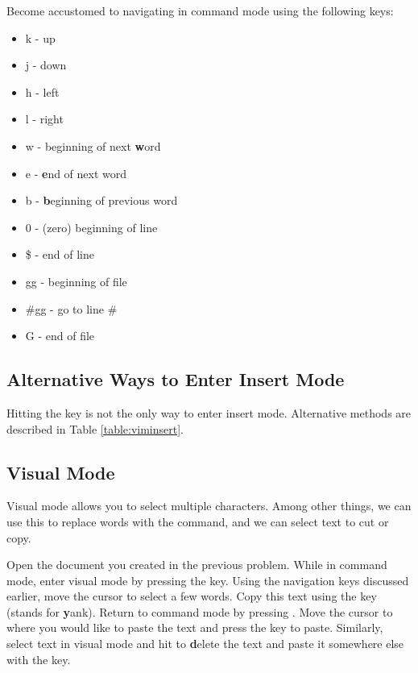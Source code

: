 \begin{problem}
Become accustomed to navigating in command mode using the following keys:
\begin{itemize}
\item k - up
\item j - down
\item h - left
\item l - right
\item w - beginning of next \textbf{w}ord
\item e - \textbf{e}nd of next word
\item b - \textbf{b}eginning of previous word
\item 0 - (zero) beginning of line
\item \$ - end of line
\item gg - beginning of file
\item \#gg - go to line \#
\item G - end of file
\end{itemize}
\end{problem}

\subsection*{Alternative Ways to Enter Insert Mode} %

Hitting the  key is not the only way to enter insert mode.
Alternative methods are described in Table \ref{table:viminsert}.

\subsection*{Visual Mode} %

Visual mode allows you to select multiple characters.
Among other things, we can use this to replace words with the  command, and we can select text to cut or copy.

\begin{problem}
Open the document you created in the previous problem.
While in command mode, enter visual mode by pressing the  key.
Using the navigation keys discussed earlier, move the cursor to select a few words.
Copy this text using the  key (stands for \textbf{y}ank).
Return to command mode by pressing .
Move the cursor to where you would like to paste the text and press the  key to paste.
Similarly, select text in visual mode and hit  to \textbf{d}elete the text and paste it somewhere else with the  key.
\end{problem}

